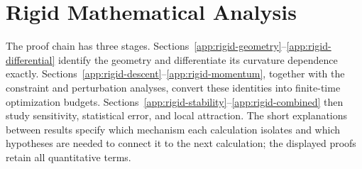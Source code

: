 \section{Rigid Mathematical Analysis}
\label{app:complete-theory}
The proof chain has three stages. Sections~\ref{app:rigid-geometry}--\ref{app:rigid-differential} identify the geometry and differentiate its curvature dependence exactly. Sections~\ref{app:rigid-descent}--\ref{app:rigid-momentum}, together with the constraint and perturbation analyses, convert these identities into finite-time optimization budgets. Sections~\ref{app:rigid-stability}--\ref{app:rigid-combined} then study sensitivity, statistical error, and local attraction. The short explanations between results specify which mechanism each calculation isolates and which hypotheses are needed to connect it to the next calculation; the displayed proofs retain all quantitative terms.
\begingroup
\allowdisplaybreaks[3]











\endgroup
